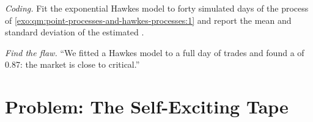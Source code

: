 \begin{exercise}[$\star\star\star$]\label{exo:qm:point-processes-and-hawkes-processes:7}
\emph{Coding.} Fit the exponential Hawkes model to forty simulated days of the process of
\cref{exo:qm:point-processes-and-hawkes-processes:1} and report the mean and standard deviation of the
estimated .
\end{exercise}

\begin{exercise}[$\star\star\star$]\label{exo:qm:point-processes-and-hawkes-processes:8}
\emph{Find the flaw.} ``We fitted a Hawkes model to a full day of trades and found a  of 0.87:
the market is close to critical.''
\end{exercise}

\section{Problem: The Self-Exciting Tape}

